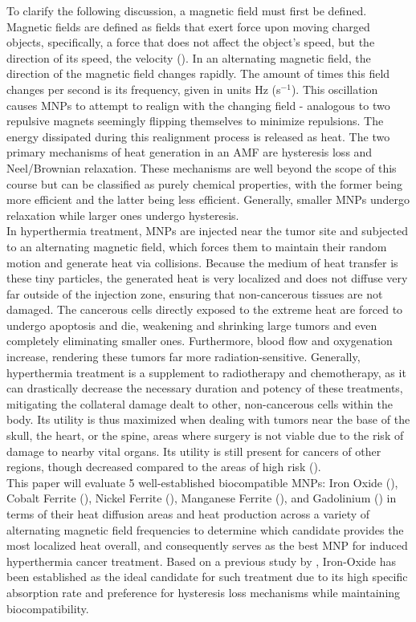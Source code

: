 \documentclass[12pt]{article}
\numberwithin{equation}{section}
\numberwithin{equation}{section}
\begin{document}
To clarify the following discussion, a magnetic field must first be defined. Magnetic fields are defined as fields that exert force upon moving charged objects, specifically, a force that does not affect the object's speed, but the direction of its speed, the velocity (\cite{BritannicaMagneticField}). In an alternating magnetic field, the direction of the magnetic field changes rapidly. The amount of times this field changes per second is its frequency, given in units Hz (s$^{-1}$). This oscillation causes MNPs to attempt to realign with the changing field - analogous to two repulsive magnets seemingly flipping themselves to minimize repulsions. The energy dissipated during this realignment process is released as heat. The two primary mechanisms of heat generation in an AMF are hysteresis loss and Neel/Brownian relaxation. These mechanisms are well beyond the scope of this course but can be classified as purely chemical properties, with the former being more efficient and the latter being less efficient. Generally, smaller MNPs undergo relaxation while larger ones undergo hysteresis. \\
 In hyperthermia treatment, MNPs are injected near the tumor site and subjected to an alternating magnetic field, which forces them to maintain their random motion and generate heat via collisions. Because the medium of heat transfer is these tiny particles, the generated heat is very localized and does not diffuse very far outside of the injection zone, ensuring that non-cancerous tissues are not damaged. The cancerous cells directly exposed to the extreme heat are forced to undergo apoptosis and die, weakening and shrinking large tumors and even completely eliminating smaller ones. Furthermore, blood flow and oxygenation increase, rendering these tumors far more radiation-sensitive. Generally, hyperthermia treatment is a supplement to radiotherapy and chemotherapy, as it can drastically decrease the necessary duration and potency of these treatments, mitigating the collateral damage dealt to other, non-cancerous cells within the body. Its utility is thus maximized when dealing with tumors near the base of the skull, the heart, or the spine, areas where surgery is not viable due to the risk of damage to nearby vital organs. Its utility is still present for cancers of other regions, though decreased compared to the areas of high risk (\cite{Neel/BrownianRelaxation}).\\
This paper will evaluate 5 well-established biocompatible MNPs: Iron Oxide (), Cobalt Ferrite (), Nickel Ferrite (), Manganese Ferrite (), and Gadolinium () in terms of their heat diffusion areas and heat production across a variety of alternating magnetic field frequencies to determine which candidate provides the most localized heat overall, and consequently serves as the best MNP for induced hyperthermia cancer treatment. {Based on a previous study by} \cite{JIANG2022107707}, {Iron-Oxide has been established as the ideal candidate for such treatment due to its high specific absorption rate and preference for hysteresis loss mechanisms while maintaining biocompatibility.}\\
\end{document}

